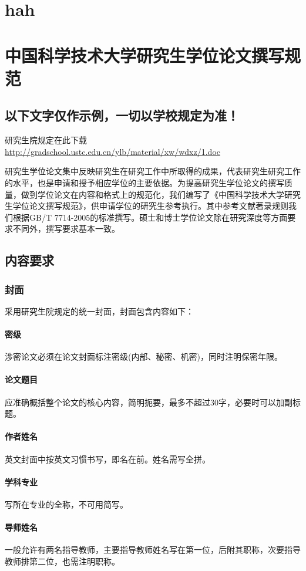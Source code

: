 \chapter{hah}
\chapter{中国科学技术大学研究生学位论文撰写规范}
\label{chap:requires}
\section*{以下文字仅作示例，一切以学校规定为准！}
研究生院规定在此下载\url{http://gradschool.ustc.edu.cn/ylb/material/xw/wdxz/1.doc}

研究生学位论文集中反映研究生在研究工作中所取得的成果，代表研究生研究工作的水平，也是申请和授予相应学位的主要依据。为提高研究生学位论文的撰写质量，做到学位论文在内容和格式上的规范化，我们编写了《中国科学技术大学研究生学位论文撰写规范》，供申请学位的研究生参考执行。其中参考文献著录规则我们根据GB/T 7714-2005的标准撰写。硕士和博士学位论文除在研究深度等方面要求不同外，撰写要求基本一致。

\section{内容要求}

\subsection{封面} 
采用研究生院规定的统一封面，封面包含内容如下： 
\subsubsection{密级} 涉密论文必须在论文封面标注密级(内部、秘密、机密)，同时注明保密年限。
\subsubsection{论文题目} 应准确概括整个论文的核心内容，简明扼要，最多不超过30字，必要时可以加副标题。
\subsubsection{作者姓名} 英文封面中按英文习惯书写，即名在前。姓名需写全拼。
\subsubsection{学科专业} 写所在专业的全称，不可用简写。
\subsubsection{导师姓名} 一般允许有两名指导教师，主要指导教师姓名写在第一位，后附其职称，次要指导教师排第二位，也需注明职称。
